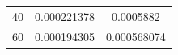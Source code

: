 \documentclass{jreport}		%
\begin{document}
\begin{table}
\begin{center}
\begin{tabular}{c|cc}
40&0.000221378&0.0005882 \\
60&0.000194305&0.000568074 \\

\end{tabular}
\end{center}
\end{table}
\end{document}
